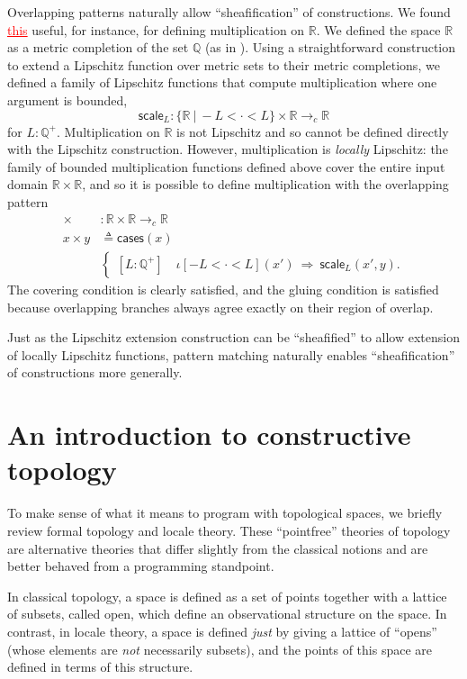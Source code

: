 \documentclass[conference]{IEEEtran}
\newcommand{\cto}{\to_c}
\newcommand{\R}{\mathbb{R}}
\newcommand{\rat}{\mathbb{Q}}
\newcommand{\suchthat}{\ |\ }
\newcommand{\oinclf}[1]{\iota[{#1}]}
\newcommand{\oincl}[2]{\oinclf{#1} \left({#2}\right)}
\newcommand{\Branch}{\Rightarrow}
\newcommand{\grammar}[1]{\textcolor{red}{\underline{#1}}}
\begin{document}
Overlapping patterns naturally allow ``sheafification'' of constructions. We found \grammar{this} useful, for instance, for defining multiplication on $\R$. We defined the space $\R$ as a metric completion of the set $\rat$ (as in \cite{vickersmetric}). Using a straightforward construction to extend a Lipschitz function over metric sets to their metric completions, we defined a family of Lipschitz functions that compute multiplication where one argument is bounded,
\[
\mathsf{scale}_L : \{ \R \suchthat -L < \cdot < L \} \times \R \cto \R
\]
for $L : \rat^+$. Multiplication on $\R$ is not Lipschitz and so cannot be defined directly with the Lipschitz construction. However, multiplication is \emph{locally} Lipschitz: the family of bounded multiplication functions defined above cover the entire input domain $\R \times \R$, and so it is possible to define multiplication with the overlapping pattern
\begin{align*}
\times &: \R \times \R \cto \R
\\ x \times y &\triangleq
\mathsf{cases}(x)
\\
&\begin{cases}
[L : \rat^+] \quad \oincl{-L < \cdot < L}{x'}  \  \Branch \  \mathsf{scale}_L(x', y).
\end{cases}
\end{align*}
The covering condition is clearly satisfied, and the gluing condition is satisfied because overlapping branches always agree exactly on their region of overlap.

Just as the Lipschitz extension construction can be ``sheafified'' to allow extension of locally Lipschitz functions, pattern matching naturally enables ``sheafification'' of constructions more generally.

\section{An introduction to constructive topology}
\label{s:topology}

To make sense of what it means to program with topological spaces, we briefly review formal topology and locale theory. These ``pointfree'' theories of topology are alternative theories that differ slightly from the classical notions and are better behaved from a programming standpoint.

In classical topology, a space is defined as a set of points together with a lattice of subsets, called open, which define an observational structure on the space. In contrast, in locale theory, a space is defined \emph{just} by giving a lattice of ``opens'' (whose elements are \emph{not} necessarily subsets), and the points of this space are defined in terms of this structure.
\end{document}
